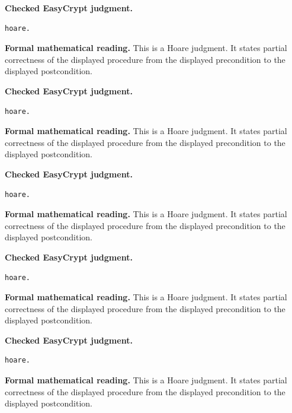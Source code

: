 \begin{formaljudgment}
\noindent\textbf{Checked EasyCrypt judgment.}
\begin{lstlisting}[language=EasyCrypt,basicstyle=\ttfamily\scriptsize]
hoare.
\end{lstlisting}
\noindent\textbf{Formal mathematical reading.} This is a Hoare judgment.  It states partial correctness of the displayed procedure from the displayed precondition to the displayed postcondition.
\end{formaljudgment}

\begin{formaljudgment}
\noindent\textbf{Checked EasyCrypt judgment.}
\begin{lstlisting}[language=EasyCrypt,basicstyle=\ttfamily\scriptsize]
hoare.
\end{lstlisting}
\noindent\textbf{Formal mathematical reading.} This is a Hoare judgment.  It states partial correctness of the displayed procedure from the displayed precondition to the displayed postcondition.
\end{formaljudgment}

\begin{formaljudgment}
\noindent\textbf{Checked EasyCrypt judgment.}
\begin{lstlisting}[language=EasyCrypt,basicstyle=\ttfamily\scriptsize]
hoare.
\end{lstlisting}
\noindent\textbf{Formal mathematical reading.} This is a Hoare judgment.  It states partial correctness of the displayed procedure from the displayed precondition to the displayed postcondition.
\end{formaljudgment}

\begin{formaljudgment}
\noindent\textbf{Checked EasyCrypt judgment.}
\begin{lstlisting}[language=EasyCrypt,basicstyle=\ttfamily\scriptsize]
hoare.
\end{lstlisting}
\noindent\textbf{Formal mathematical reading.} This is a Hoare judgment.  It states partial correctness of the displayed procedure from the displayed precondition to the displayed postcondition.
\end{formaljudgment}

\begin{formaljudgment}
\noindent\textbf{Checked EasyCrypt judgment.}
\begin{lstlisting}[language=EasyCrypt,basicstyle=\ttfamily\scriptsize]
hoare.
\end{lstlisting}
\noindent\textbf{Formal mathematical reading.} This is a Hoare judgment.  It states partial correctness of the displayed procedure from the displayed precondition to the displayed postcondition.
\end{formaljudgment}

